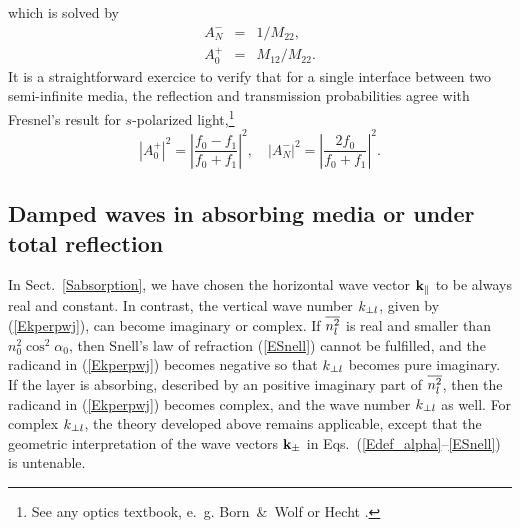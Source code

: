 which is solved by
\begin{equation}
  \begin{array}{lcl}
    A^-_N &=& 1/M_{22},\\[.2ex]
    A^+_0 &=& M_{12}/M_{22}.
  \end{array}
\end{equation}
It is a straightforward exercice to verify
that for a single interface between two semi-infinite media,
the reflection and transmission probabilities
agree with Fresnel's result for $s$-polarized light,\footnote
{See any optics textbook, e.~g. Born~\&~Wolf \cite[ch.~1.5.2]{BoWo99}
  or Hecht \cite[ch.~4.6.2]{Hec02}.}
\begin{equation}
  \left| A^+_0\right|^2
  = \left|\frac{f_0-f_1}{f_0+f_1}\right|^2,
  \quad
  \left| A^-_N\right|^2
  = \left| \frac{2f_0}{f_0+f_1}\right|^2.
\end{equation}


\subsection{Damped waves in absorbing media
  or under total reflection}\label{s:complex}

In Sect.~\ref{Sabsorption},
we have chosen the horizontal wave vector $\mathbf{k}_{\parallel}$
to be always real and constant.
In contrast, the vertical wave number $k_{\perp l}$,
given by (\ref{Ekperpwj}),
can become imaginary or complex.
If $\overline{n_l^2}$ is real and smaller than~$n_0^2\cos^2\alpha_0$,
then Snell's law of refraction (\ref{ESnell}) cannot be fulfilled,
and the radicand in (\ref{Ekperpwj}) becomes negative
so that $k_{\perp l}$ becomes pure imaginary.
%
If the layer is absorbing,
described by an positive imaginary part of $\overline{n_l^2}$,
then the radicand in (\ref{Ekperpwj}) becomes complex,
and the wave number $k_{\perp l}$ as well.
For complex $k_{\perp l}$,
the theory developed above remains applicable,
except that the geometric interpretation of the wave vectors $\mathbf{k}_\pm$
in Eqs.~(\ref{Edef_alpha}--\ref{ESnell}) is untenable.

